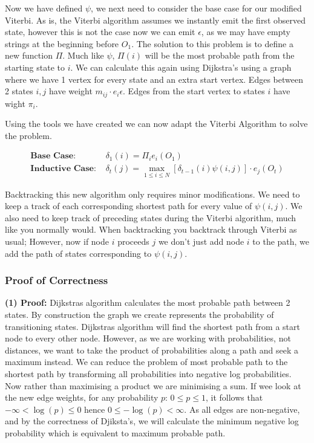 Now we have defined $\psi$, we next need to consider the base case for our modified Viterbi. As is, the Viterbi algorithm assumes we instantly emit the first observed state, however this is not the case now we can emit $\epsilon$, as we may have empty strings at the beginning before $O_1$. The solution to this problem is to define a new function $\Pi$. Much like $\psi$, $\Pi(i)$ will be the most probable path from the starting state to $i$. We can calculate this again using Dijkstra's using a graph where we have 1 vertex for every state and an extra start vertex. Edges between 2 states $i,j$ have weight $m_{ij}\cdot e_i{\epsilon}$. Edges from the start vertex to states $i$ have wight $\pi_i$.

Using the tools we have created we can now adapt the Viterbi Algorithm to solve the problem.


\begin{align*}
    \textbf{Base Case: } &\delta_1(i) = \Pi_i e_i(O_1)\\
    \textbf{Inductive Case: } &\delta_t(j) = \max_{1\leq i \leq N}[\delta_{t-1}(i)\psi(i,j)]\cdot e_j(O_t)
\end{align*}

Backtracking this new algorithm only requires minor modifications. We need to keep a track of each corresponding shortest path for every value of $\psi(i,j)$. We also need to keep track of preceding states during the Viterbi algorithm, much like you normally would. When backtracking you backtrack through Viterbi as usual; However, now if node $i$ proceeds $j$ we don't just add node $i$ to the path, we add the path of states corresponding to $\psi(i,j)$.

\subsubsection*{Proof of Correctness}

\textbf{(1) Proof:} Dijkstras algorithm calculates the most probable path between 2 states. By construction the graph we create represents the probability of transitioning states. Dijkstras algorithm will find the shortest path from a start node to every other node. However, as we are working with probabilities, not distances, we want to take the product of probabilities along a path and seek a maximum instead. We can reduce the problem of most probable path to the shortest path by transforming all probabilities into negative log probabilities. Now rather than maximising a product we are minimising a sum. If wee look at the new edge weights, for any probability $p$: $0 \leq p \leq 1$, it follows that $-\infty < \log(p) \leq 0$ hence $0 \leq -\log(p) < \infty$. As all edges are non-negative, and by the correctness of Djiksta's, we will calculate the minimum negative log probability which is equivalent to maximum probable path.

